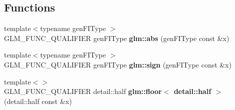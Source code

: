 \subsection*{Functions}
\begin{DoxyCompactItemize}
\item 
\hypertarget{namespaceglm_a5c82b1e2a9cb12b4a70d22a8f987273d}{{\footnotesize template$<$typename gen\-F\-I\-Type $>$ }\\G\-L\-M\-\_\-\-F\-U\-N\-C\-\_\-\-Q\-U\-A\-L\-I\-F\-I\-E\-R gen\-F\-I\-Type {\bfseries glm\-::abs} (gen\-F\-I\-Type const \&x)}\label{namespaceglm_a5c82b1e2a9cb12b4a70d22a8f987273d}

\item 
\hypertarget{namespaceglm_aaa1babcfcb872aa6bf5e701c20ac4fda}{{\footnotesize template$<$typename gen\-F\-I\-Type $>$ }\\G\-L\-M\-\_\-\-F\-U\-N\-C\-\_\-\-Q\-U\-A\-L\-I\-F\-I\-E\-R gen\-F\-I\-Type {\bfseries glm\-::sign} (gen\-F\-I\-Type const \&x)}\label{namespaceglm_aaa1babcfcb872aa6bf5e701c20ac4fda}

\item 
\hypertarget{namespaceglm_ad87110896994fda992155f8ee13ca1ee}{{\footnotesize template$<$$>$ }\\G\-L\-M\-\_\-\-F\-U\-N\-C\-\_\-\-Q\-U\-A\-L\-I\-F\-I\-E\-R detail\-::half {\bfseries glm\-::floor$<$ detail\-::half $>$} (detail\-::half const \&x)}\label{namespaceglm_ad87110896994fda992155f8ee13ca1ee}


\end{DoxyCompactItemize}
